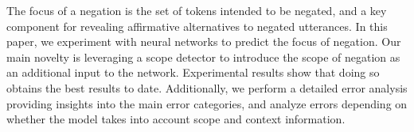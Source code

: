 The focus of a negation is the set of tokens intended to be negated, and a key component for revealing affirmative alternatives to negated utterances. In this paper, we experiment with neural networks to predict the focus of negation. Our main novelty is leveraging a scope detector to introduce the scope of negation as an additional input to the network. Experimental results show that doing so obtains the best results to date. Additionally, we perform a detailed error analysis providing insights into the main error categories, and analyze errors depending on whether the model takes into account scope and context information.
